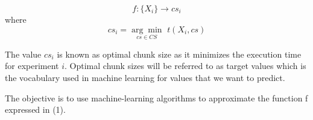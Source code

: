 \begin{equation}
	f:\{X_i\}\rightarrow cs_i
\end{equation}
 where
\begin{equation}
 cs_i=\underset{cs \in CS}{\arg\min} \, \, t(X_i,cs)
\end{equation}

The  value $cs_i$ is known as optimal chunk size as it minimizes the execution time for experiment $i$. Optimal chunk sizes will be referred to as target values which is the vocabulary used in machine learning for values that we want to predict.

The objective is to use machine-learning algorithms to approximate the function f expressed in (1).
